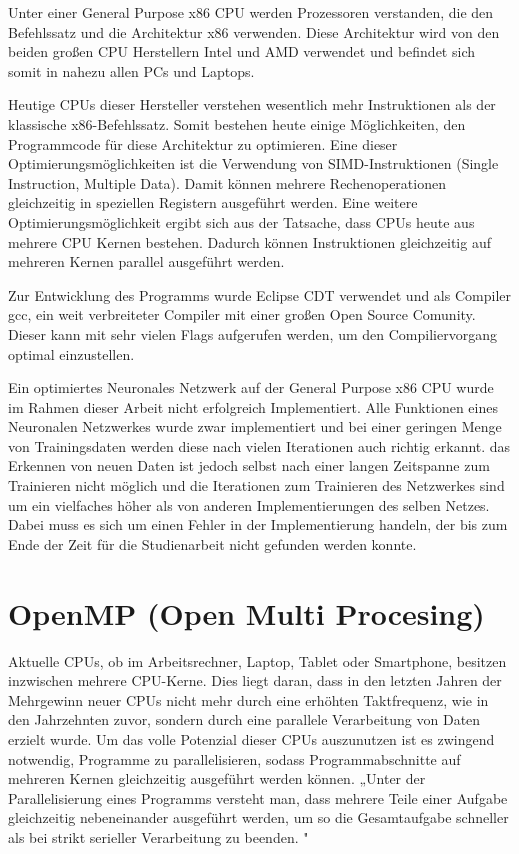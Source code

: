 \documentclass[../main.tex]{subfiles}
\begin{document}
Unter einer General Purpose x86 CPU werden Prozessoren verstanden, die den Befehlssatz und die Architektur x86 verwenden. Diese Architektur wird von den beiden großen CPU Herstellern Intel und AMD verwendet und befindet sich somit in nahezu allen PCs und Laptops. 

Heutige CPUs dieser Hersteller verstehen wesentlich mehr Instruktionen als der klassische x86-Befehlssatz. Somit bestehen heute einige Möglichkeiten, den Programmcode für diese Architektur zu optimieren. Eine dieser Optimierungsmöglichkeiten ist die Verwendung von SIMD-Instruktionen (Single Instruction, Multiple Data). Damit können mehrere Rechenoperationen gleichzeitig in speziellen Registern ausgeführt werden.
Eine weitere Optimierungsmöglichkeit ergibt sich aus der Tatsache,  dass CPUs heute aus mehrere CPU Kernen bestehen. Dadurch können Instruktionen gleichzeitig auf mehreren Kernen parallel ausgeführt werden.

Zur Entwicklung des Programms wurde Eclipse CDT verwendet und als Compiler gcc, ein weit verbreiteter Compiler mit einer großen Open Source Comunity. Dieser kann mit sehr vielen Flags aufgerufen werden, um den Compiliervorgang optimal einzustellen.

Ein optimiertes Neuronales Netzwerk auf der General Purpose x86 CPU wurde im Rahmen dieser Arbeit nicht erfolgreich Implementiert. Alle Funktionen eines Neuronalen Netzwerkes wurde zwar implementiert und bei einer geringen Menge von Trainingsdaten werden diese nach vielen Iterationen auch richtig erkannt. das Erkennen von neuen Daten ist jedoch selbst nach einer langen Zeitspanne zum Trainieren nicht möglich und die Iterationen zum Trainieren des Netzwerkes sind um ein vielfaches höher als von anderen Implementierungen des selben Netzes. Dabei muss es sich um einen Fehler in der Implementierung handeln, der bis zum Ende der Zeit für die Studienarbeit nicht gefunden werden konnte. 

\section{OpenMP (Open Multi Procesing)}

Aktuelle CPUs, ob im Arbeitsrechner, Laptop, Tablet oder Smartphone, besitzen inzwischen mehrere CPU-Kerne. Dies liegt daran, dass in den letzten Jahren der Mehrgewinn neuer CPUs nicht mehr durch eine erhöhten Taktfrequenz, wie in den Jahrzehnten zuvor, sondern durch eine parallele Verarbeitung von Daten erzielt wurde. Um das volle Potenzial dieser CPUs auszunutzen ist es zwingend notwendig, Programme zu parallelisieren, sodass Programmabschnitte auf mehreren Kernen gleichzeitig ausgeführt werden können.
„Unter der Parallelisierung eines Programms versteht man, dass mehrere Teile einer Aufgabe gleichzeitig nebeneinander ausgeführt werden, um so die Gesamtaufgabe schneller als bei strikt serieller Verarbeitung zu beenden. \cite{articleOpenMP}"
\end{document}
